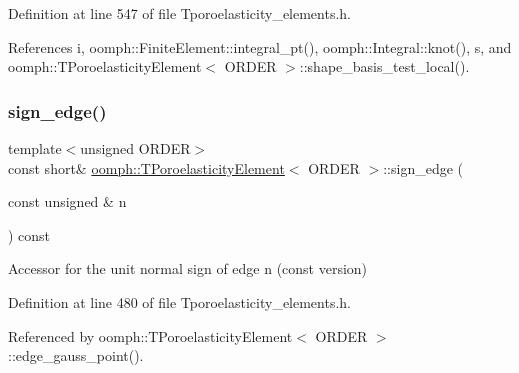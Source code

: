 Definition at line 547 of file Tporoelasticity\+\_\+elements.\+h.



References i, oomph\+::\+Finite\+Element\+::integral\+\_\+pt(), oomph\+::\+Integral\+::knot(), s, and oomph\+::\+T\+Poroelasticity\+Element$<$ O\+R\+D\+E\+R $>$\+::shape\+\_\+basis\+\_\+test\+\_\+local().

\mbox{\label{classoomph_1_1TPoroelasticityElement_ae409fa6246d5aa0e70220dbfd5e69efe}} 
\subsubsection{\texorpdfstring{sign\+\_\+edge()}{sign\_edge()}\hspace{0.1cm}{\footnotesize\ttfamily [1/2]}}
{\footnotesize\ttfamily template$<$unsigned O\+R\+D\+ER$>$ \\
const short\& \hyperlink{classoomph_1_1TPoroelasticityElement}{oomph\+::\+T\+Poroelasticity\+Element}$<$ O\+R\+D\+ER $>$\+::sign\+\_\+edge (\begin{DoxyParamCaption}\item[{const unsigned \&}]{n }\end{DoxyParamCaption}) const\hspace{0.3cm}{\ttfamily [inline]}}



Accessor for the unit normal sign of edge n (const version) 



Definition at line 480 of file Tporoelasticity\+\_\+elements.\+h.



Referenced by oomph\+::\+T\+Poroelasticity\+Element$<$ O\+R\+D\+E\+R $>$\+::edge\+\_\+gauss\+\_\+point().

\mbox{\label{classoomph_1_1TPoroelasticityElement_a01c19cf3bcfbf7fb986f20ba4711a951}} 
